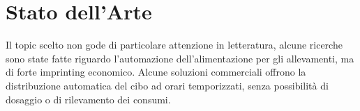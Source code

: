 

\chapter{Stato dell'Arte}
Il topic scelto non gode di particolare attenzione in letteratura, alcune ricerche sono state fatte riguardo l'automazione dell’alimentazione per gli allevamenti, ma di forte imprinting economico. 
Alcune soluzioni commerciali offrono la distribuzione automatica del cibo ad orari temporizzati, senza possibilità di dosaggio o di rilevamento dei consumi. 